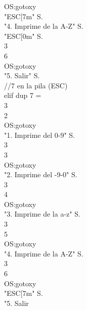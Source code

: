 \documentclass[conference]{IEEEtran}
\begin{document}
\begin{enumerate}
\begin{center}
OS:gotoxy \\ "ESC[7m" S. \\ "4. Imprime de la A-Z" S. \\ "ESC[0m" S. \\ 3 \\ 6 \\ OS:gotoxy \\ "5. Salir" S. \\ //7 en la pila (ESC) \\ elif dup 7 = \\ 3 \\ 2 \\ OS:gotoxy \\ "1. Imprime del 0-9" S. \\ 3 \\ 3 \\ OS:gotoxy \\ "2. Imprime del -9-0" S. \\ 3 \\ 4 \\ OS:gotoxy \\ "3. Imprime de la a-z" S. \\ 3 \\ 5 \\ OS:gotoxy \\ "4. Imprime de la A-Z" S. \\ 3 \\ 6 \\ OS:gotoxy \\ "ESC[7m" S. \\ "5. Salir
\end{center}
\end{enumerate}
\end{document}
